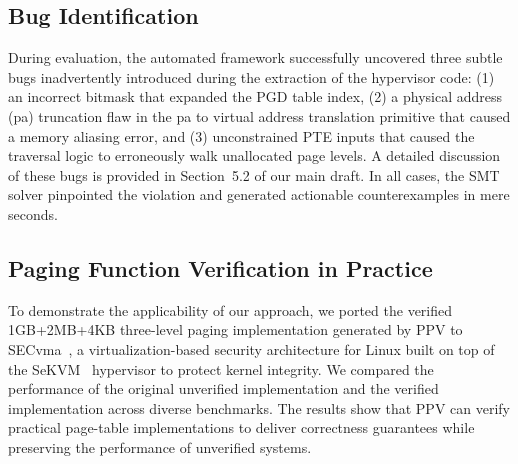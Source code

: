 \documentclass[sigplan,nonacm,10pt]{acmart}
\begin{document}
\subsection*{Bug Identification}
During evaluation, the automated framework successfully uncovered three subtle bugs inadvertently introduced during the extraction of the hypervisor code: 
(1) an incorrect bitmask that expanded the PGD table index, 
(2) a physical address (pa) truncation flaw in the pa to virtual address translation primitive that caused a memory aliasing error, and 
(3) unconstrained PTE inputs that caused the traversal logic to erroneously walk unallocated page levels. A detailed discussion of these bugs is provided in Section~5.2 of our main draft.
In all cases, the SMT solver pinpointed the violation and generated actionable counterexamples in mere seconds.

\subsection*{Paging Function Verification in Practice}
To demonstrate the applicability of our approach, we ported the verified 1GB+2MB+4KB three-level paging implementation generated by PPV to SECvma~\cite{secvma2024acsac}, a virtualization-based security architecture for Linux built on top of the SeKVM~\cite{li:ieeesp2021} hypervisor to protect kernel integrity. We compared the performance of the original unverified implementation and the verified implementation across diverse benchmarks. The results show that PPV can verify practical page-table implementations to deliver correctness guarantees while preserving the performance of unverified systems.



\end{document}
